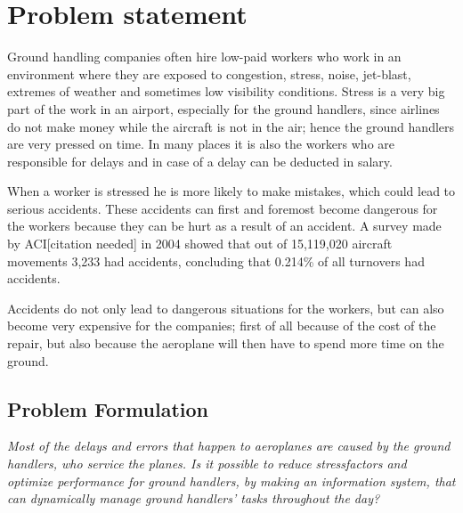 \section{Problem statement}

Ground handling companies often hire low-paid workers who work in an environment where they are exposed to congestion, stress, noise, jet-blast, extremes of weather and sometimes low visibility conditions. Stress is a very big part of the work in an airport, especially for the ground handlers, since airlines do not make money while the aircraft is not in the air; hence the ground handlers are very pressed on time.  In many places it is also the workers who are responsible for delays and in case of a delay can be deducted in salary.

When a worker is stressed he is more likely to make mistakes, which could lead to serious accidents. These accidents can first and foremost become dangerous for the workers because they can be hurt as a result of an accident. A survey made by ACI[citation needed] in 2004 showed that out of 15,119,020 aircraft movements 3,233 had accidents, concluding that 0.214\% of all turnovers had accidents.

Accidents do not only lead to dangerous situations for the workers, but can also become very expensive for the companies; first of all because of the cost of the repair, but also because the aeroplane will then have to spend more time on the ground.
\subsection{Problem Formulation}
\begin{center}
\textit{Most of the delays and errors that happen to aeroplanes are caused by the ground handlers, who service the planes. Is it possible to reduce stressfactors and optimize performance for ground handlers, by making an information system, that can dynamically manage ground handlers' tasks throughout the day?}
\end{center}
